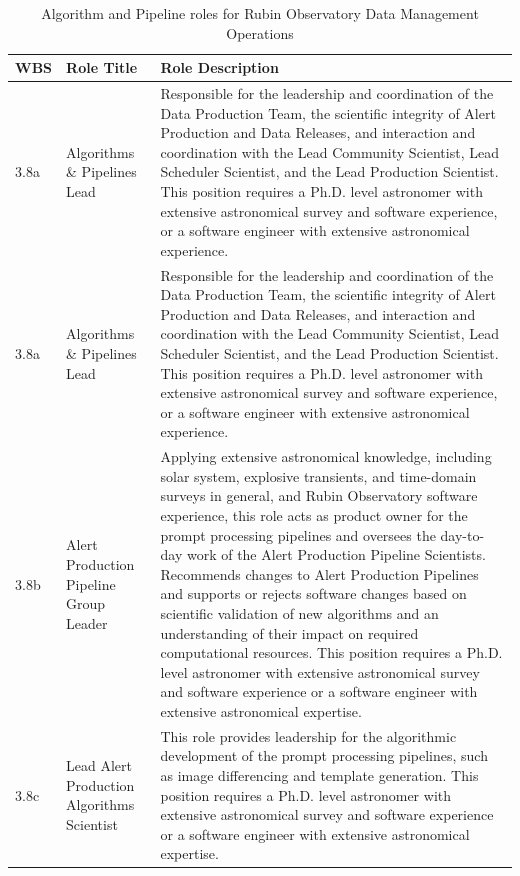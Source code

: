 \normalsize \begin{longtable} {|p{}|p{}|p{}|} \caption{Algorithm and Pipeline roles for Rubin Observatory Data Management Operations \label{tab:aproles}}\\ 
\hline 
\textbf{WBS}&\textbf{Role Title}&\textbf{Role Description} \\ \hline
{3.8a}&{Algorithms \& Pipelines Lead}&{Responsible for the leadership and coordination of the Data Production Team, the scientific integrity of Alert Production and Data Releases, and interaction and coordination with the Lead Community Scientist, Lead Scheduler Scientist, and the Lead Production Scientist. This position requires a Ph.D. level astronomer with extensive astronomical survey and software experience, or a software engineer with extensive astronomical experience.} \\ \hline
{3.8a}&{Algorithms \& Pipelines Lead}&{Responsible for the leadership and coordination of the Data Production Team, the scientific integrity of Alert Production and Data Releases, and interaction and coordination with the Lead Community Scientist, Lead Scheduler Scientist, and the Lead Production Scientist. This position requires a Ph.D. level astronomer with extensive astronomical survey and software experience, or a software engineer with extensive astronomical experience.} \\ \hline
{3.8b}&{Alert Production Pipeline Group Leader}&{Applying extensive astronomical knowledge, including solar system, explosive transients, and time-domain surveys in general, and Rubin Observatory software experience, this role acts as product owner for the prompt processing pipelines and oversees the day-to-day work of the Alert Production Pipeline Scientists. Recommends changes to Alert Production Pipelines and supports or rejects software changes based on scientific validation of new algorithms and an understanding of their impact on required computational resources. This position requires a Ph.D. level astronomer with extensive astronomical survey and software experience or a software engineer with extensive astronomical expertise.} \\ \hline
{3.8c}&{Lead Alert Production Algorithms Scientist}&{This role provides leadership for the algorithmic development of the prompt processing pipelines, such as image differencing and template generation. This position requires a Ph.D. level astronomer with extensive astronomical survey and software experience or a software engineer with extensive astronomical expertise.} \\ \hline

\end{longtable}
